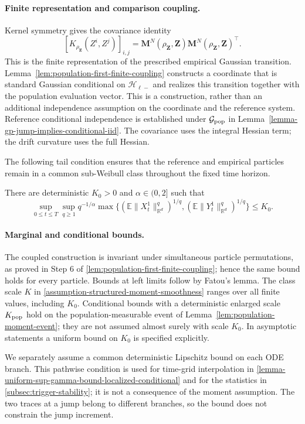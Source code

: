 \paragraph{Finite representation and comparison coupling.}
Kernel symmetry gives the covariance identity
\[
 [K_{\rho_{\mathbf Z}}(Z^i,Z^j)]_{i,j}
 =\mathbf M^N(\rho_{\mathbf Z},\mathbf Z)
       \mathbf M^N(\rho_{\mathbf Z},\mathbf Z)^\top.
\]
This is the finite representation of the prescribed empirical Gaussian
transition. Lemma~\ref{lem:population-first-finite-coupling} constructs a
coordinate that is standard Gaussian conditional on $\mathcal H_{\ell-}$
and realizes this transition together with the population evaluation vector.
This is a construction, rather than an additional independence assumption
on the coordinate and the reference system. Reference conditional
independence is established under $\mathcal G_{\rm pop}$ in
Lemma~\ref{lemma-gp-jump-implies-conditional-iid}.
The covariance uses the integral Hessian term; the drift curvature uses
the full Hessian.

The following tail condition ensures that the reference and empirical particles remain in a common sub-Weibull class throughout the fixed time horizon.

\begin{assumption}
\label{assumption-moment-growth}
There are deterministic $K_0>0$ and $\alpha\in(0,2]$ such that
\[
\sup_{0\le t\le T}\sup_{q\ge1}q^{-1/\alpha}
\max\{(\mathbb E\|X_t^1\|_{\mathbb R^d}^q)^{1/q},
       (\mathbb E\|Y_t^1\|_{\mathbb R^d}^q)^{1/q}\}\le K_0.
\]
\end{assumption}
\paragraph{Marginal and conditional bounds.}
The coupled construction is invariant under simultaneous particle
permutations, as proved in Step 6 of
\cref{lem:population-first-finite-coupling}; hence the same bound holds
for every particle. Bounds at left
limits follow by Fatou's lemma. The class scale $K$ in
\cref{assumption-structured-moment-smoothness} ranges over all finite
values, including $K_0$. Conditional bounds with a deterministic
enlarged scale $K_{\rm pop}$ hold on the population-measurable event of
Lemma~\ref{lem:population-moment-event}; they are not assumed almost surely
with scale $K_0$. In asymptotic statements a uniform bound on $K_0$ is
specified explicitly.

We separately assume a common deterministic Lipschitz bound on each ODE
branch. This pathwise condition is used for time-grid interpolation in
\cref{lemma-uniform-sup-gamma-bound-localized-conditional} and for the statistics in \cref{subsec:trigger-stability}; it is not a consequence
of the moment assumption. The two traces at a jump belong to different
branches, so the bound does not constrain the jump increment.

